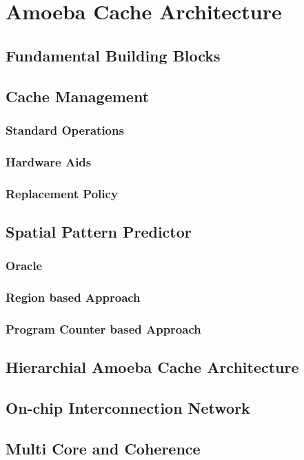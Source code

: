 %
%

\chapter{Amoeba Cache Architecture}
\label{three}


\section{Fundamental Building Blocks}
\section{Cache Management}
\subsection{Standard Operations}
\subsection{Hardware Aids}
\subsection{Replacement Policy}
\section{Spatial Pattern Predictor}
\subsection{Oracle}
\subsection{Region based Approach}
\subsection{Program Counter based Approach}
\section{Hierarchial Amoeba Cache Architecture}
\section{On-chip Interconnection Network}
\section{Multi Core and Coherence}
